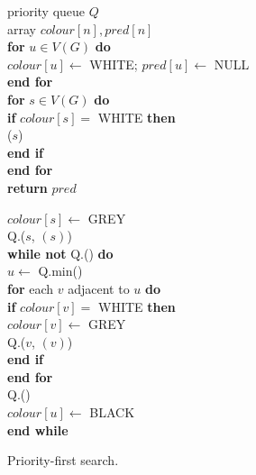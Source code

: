 \begin{figure}
{
priority queue $Q$\\

array $colour[n], pred[n]$ \\

\textbf{for} $u \in V(G)$ \textbf{do} \\

\> $colour[u] \gets $ WHITE; $pred[u] \gets $ NULL \\

\textbf{end for}\\

\textbf{for}  $s\in V(G)$ \textbf{do} \\

\> \textbf{if} $colour[s] = $ WHITE \textbf{then} \\

\> \> ($s$) \\

\> \textbf{end if}\\

\textbf{end for}\\

\textbf{return} $pred$\\
}




{
$colour[s] \gets $ GREY \\

Q.($s$,  $(s)$) \\

\textbf{while not} Q.() \textbf{do} \\

\> $u \gets $ Q.min() \\

\> \textbf{for} each $v$ adjacent to $u$ \textbf{do} \\

\> \>  \textbf{if} $colour[v] = $ WHITE \textbf{then} \\

\> \> \> $colour[v] \gets $ GREY \\

\> \> \> Q.($v$,  $(v)$) \\

\> \> \textbf{end if} \\

\> \textbf{end for} \\

\> Q.() \\

\> $colour[u] \gets $ BLACK \\

\textbf{end while} \\
}

\caption{Priority-first search.}
\label{fig:PFScode}

\end{figure}

